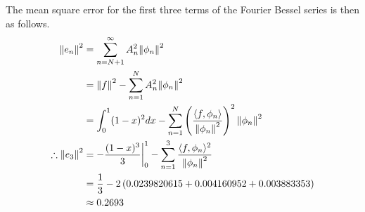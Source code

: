 \documentclass[a4paper]{article}
\begin{document}
\begin{enumerate}
\begin{enumerate}
		The mean square error for the first three terms of the Fourier Bessel series is then as follows.
		\begin{align*}
			\norm{e_n}^2 & = \sum^{\infty}_{n=N+1}A_n^2\norm{\phi_n}^2\\
			& = \norm{f}^2 - \sum^{N}_{n=1}A_n^2\norm{\phi_n}^2\\
			& = \int^1_0(1-x)^2dx - \sum^{N}_{n=1}\left(\frac{\langle f,\phi_n \rangle}{\norm{\phi_n}^2} \right)^2\norm{\phi_n}^2\\
			\therefore \norm{e_3}^2 & = -\frac{(1-x)^3}{3}\bigg|^1_0 - \sum^{3}_{n=1}\frac{\langle f,\phi_n \rangle^2}{\norm{\phi_n}^2}\\
			& = \frac{1}{3} - 2\left(0.0239820615 + 0.004160952 + 0.003883353 \right)\\
			& \approx 0.2693\\
		\end{align*}

		\pagebreak


\end{enumerate}
\end{enumerate}
\end{document}
